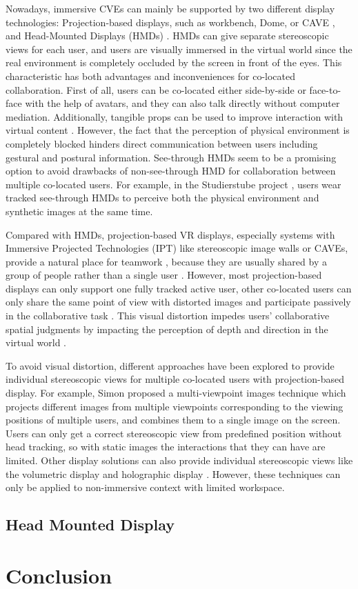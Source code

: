 Nowadays, immersive CVEs can mainly be supported by two different display technologies: Projection-based displays, such as workbench, Dome, or CAVE \citep{CruzNeira1993SPV}, and Head-Mounted Displays (HMDs) \citep{Melzer1997HMD}. HMDs can give separate stereoscopic views for each user, and users are visually immersed in the virtual world since the real environment is completely occluded by the screen in front of the eyes. This characteristic has both advantages and inconveniences for co-located collaboration. First of all, users can be co-located either side-by-side or face-to-face with the help of avatars, and they can also talk directly without computer mediation. Additionally, tangible props can be used to improve interaction with virtual content \citep{Salzmann2008TUS}. However, the fact that the perception of physical environment is completely blocked hinders direct communication between users including gestural and postural information. See-through HMDs seem to be a promising option to avoid drawbacks of non-see-through HMD for collaboration between multiple co-located users. For example, in the Studierstube project \citep{Schmalstieg2002Studierstube}, users wear tracked see-through HMDs to perceive both the physical environment and synthetic images at the same time.

Compared with HMDs, projection-based VR displays, especially systems with Immersive Projected Technologies (IPT) like stereoscopic image walls or CAVEs, provide a natural place for teamwork \citep{Johanson2002IWP}, because they are usually shared by a group of people rather than a single user \citep{Benford1996SST}. However, most projection-based displays can only support one fully tracked active user, other co-located users can only share the same point of view with distorted images and participate passively in the collaborative task \citep{Bayon2006Multiple}. This visual distortion impedes users’ collaborative spatial judgments by impacting the perception of depth and direction in the virtual world \citep{Pollock2012Right}.

To avoid visual distortion, different approaches have been explored to provide individual stereoscopic views for multiple co-located users with projection-based display. For example, Simon proposed a multi-viewpoint images technique \citep{Simon2007MVI} which projects different images from multiple viewpoints corresponding to the viewing positions of multiple users, and combines them to a single image on the screen. Users can only get a correct stereoscopic view from predefined position without head tracking, so with static images the interactions that they can have are limited. Other display solutions can also provide individual stereoscopic views like the volumetric display \citep{Grossman2008Volum} and holographic display \citep{Lucente1997Holo}. However, these techniques can only be applied to non-immersive context with limited workspace.

\subsection{Head Mounted Display}

\section{Conclusion}

